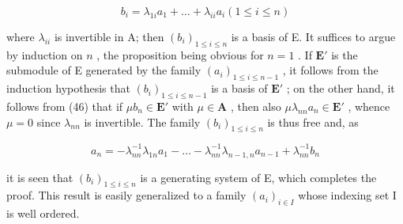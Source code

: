 \[
b _ {i} = \lambda_ {1 i} a _ {1} + \dots + \lambda_ {i i} a _ {i} (1 \leqslant i \leqslant n)\tag{46}
\]

where \(\lambda_{ii}\) is invertible in A; then \((b_i)_{1\leqslant i\leqslant n}\) is a basis of E. It suffices to argue by induction on \(n\) , the proposition being obvious for \(n = 1\) . If \(\mathbf{E}'\) is the submodule of E generated by the family \((a_i)_{1\leqslant i\leqslant n - 1}\) , it follows from the induction hypothesis that \((b_i)_{1\leqslant i\leqslant n - 1}\) is a basis of \(\mathbf{E}'\) ; on the other hand, it follows from (46) that if \(\mu b_n\in \mathbf{E}'\) with \(\mu \in \mathbf{A}\) , then also \(\mu \lambda_{nn}a_n\in \mathbf{E}'\) , whence \(\mu = 0\) since \(\lambda_{nn}\) is invertible. The family \((b_i)_{1\leqslant i\leqslant n}\) is thus free and, as

\[
a _ {n} = - \lambda_ {n n} ^ {- 1} \lambda_ {1 n} a _ {1} - \dots - \lambda_ {n n} ^ {- 1} \lambda_ {n - 1, n} a _ {n - 1} + \lambda_ {n n} ^ {- 1} b _ {n}
\]

it is seen that \((b_{i})_{1\leqslant i\leqslant n}\) is a generating system of E, which completes the proof. This result is easily generalized to a family \((a_{i})_{i\in I}\) whose indexing set I is well ordered.
